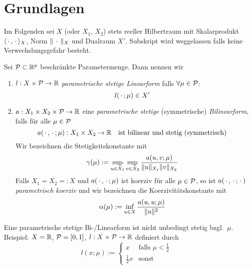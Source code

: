 \section{Grundlagen}

Im Folgenden sei $X$ (oder $X_1$, $X_2$) stets reeller Hilbertraum mit Skalarprodukt $\langle \,\cdot\,, \,\cdot\, \rangle_X$, Norm $\|\,\cdot\,\|_X$ und Dualraum $X'$.
Subskript wird weggelassen falls keine Verwechslungsgefahr besteht.

\begin{defn}
	Sei $\mathcal{P} \subset \mathbb{R}^p$ beschränkte Parametermenge. Dann nennen wir
	\begin{enumerate}
		\item $l: X \times \mathcal{P} \to \mathbb{R}$ \emph{parametrische stetige Linearform} falls $\forall \mu \in \mathcal{P}$:
			\[
				l(\,\cdot\,;\mu) \in X'
			\]
		\item $a: X_1 \times X_2 \times \mathcal{P} \to \mathbb{R}$ eine \emph{parametrische stetige} (symmetrische) \emph{Bilinearform}, falls für alle $\mu \in \mathcal{P}$
			\[
				a(\,\cdot\,,\,\cdot\,;\mu) : X_1 \times X_2 \to \mathbb{R} \quad \text{ist bilinear und stetig (symmetrisch)}
			\]
			Wir bezeichnen die Stetigkeitskonstante mit
			\[
				\gamma(\mu) := \sup_{u \in X_1} \sup_{v \in X_2} \frac{a(u,v;\mu)}{\|u\|_{X_1}\|v\|_{X_2}}
			\]
			Falls $X_1 = X_2 =: X$ und $a(\,\cdot\,,\,\cdot\,;\mu)$ ist koerziv für alle $\mu \in \mathcal{P}$, so ist $a(\,\cdot\,,\,\cdot\,;\,\cdot\,)$ \emph{parametrisch koerziv} und wir bezeichnen die Koerzivitätskonstante mit
			\[
				\alpha(\mu) := \inf_{u \in X} \frac{a(u,u;\mu)}{\|u\|^2}
			\]
	\end{enumerate}
\end{defn}

\begin{bem}
	Eine parametrische stetige Bi-/Linearform ist nicht unbedingt stetig bzgl.\ $\mu$.
	Beispiel: $X = \mathbb{R}$, $\mathcal{P} = [0,1]$, $l : X \times \mathcal{P} \to \mathbb{R}$ definiert durch
	\[
		l(x;\mu) := \begin{cases}
			x & \text{falls } \mu < \frac 1 2 \\
			\frac 1 2 x & \text{sonst}
		\end{cases}
	\]
\end{bem}

